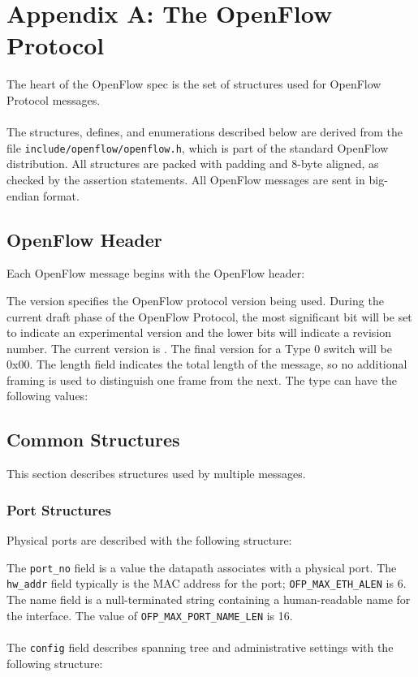 \section{Appendix A: The OpenFlow Protocol}
The heart of the OpenFlow spec is the set of structures used for OpenFlow Protocol messages.  
\\\\
The structures, defines, and enumerations described below are derived from the file \verb|include/openflow/openflow.h|, which is part of the standard OpenFlow distribution.  All structures are packed with padding and 8-byte aligned, as checked by the assertion statements.  All OpenFlow messages are sent in big-endian format.  

\subsection{OpenFlow Header}
Each OpenFlow message begins with the OpenFlow header:


The version specifies the OpenFlow protocol version being used.  During the current draft phase of the OpenFlow Protocol, the most significant bit will be set to indicate an experimental version and the lower bits will indicate a revision number.  The current version is .  The final version for a Type 0 switch will be 0x00.  The length field indicates the total length of the message, so no additional framing is used to distinguish one frame from the next.  The type can have the following values:



\subsection{Common Structures}
This section describes structures used by multiple messages.

\subsubsection{Port Structures}
Physical ports are described with the following structure:


The \verb|port_no| field is a value the datapath associates with a physical port.  The \verb|hw_addr| field typically is the MAC address for the port; \verb|OFP_MAX_ETH_ALEN| is 6.  The name field is a null-terminated string containing a human-readable name for the interface.  The value of \verb|OFP_MAX_PORT_NAME_LEN| is 16.  
\\\\
The \verb|config| field describes spanning tree and administrative settings with the following structure:

